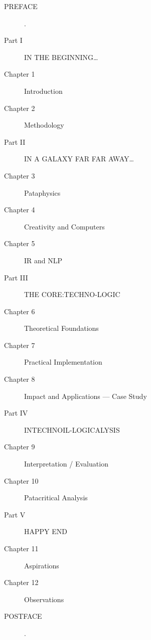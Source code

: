 \begin{description}
  \item[PREFACE] .
  \item[Part I] IN THE BEGINNING\ldots
  \item[Chapter 1] Introduction
  \item[Chapter 2] Methodology
  \item[Part II] IN A GALAXY FAR FAR AWAY\ldots
  \item[Chapter 3] Pataphysics
  \item[Chapter 4] Creativity and Computers
  \item[Chapter 5] IR and NLP
  \item[Part III] THE CORE:\@ TECHNO-LOGIC
  \item[Chapter 6] Theoretical Foundations
  \item[Chapter 7] Practical Implementation
  \item[Chapter 8] Impact and Applications --- Case Study
  \item[Part IV] INTECHNOIL-LOGICALYSIS
  \item[Chapter 9] Interpretation / Evaluation
  \item[Chapter 10] Patacritical Analysis
  \item[Part V] HAPPY END
  \item[Chapter 11] Aspirations
  \item[Chapter 12] Observations
  \item[POSTFACE] .
\end{description}

\stopcontents[chapters]
